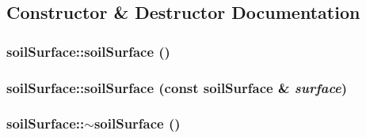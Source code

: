 \subsection{Constructor \& Destructor Documentation}
\hypertarget{classsoil_surface_a2a00df0b447ca767c659411db75ffaf4}{
\subsubsection[{soilSurface}]{\setlength{\rightskip}{0pt plus 5cm}soilSurface::soilSurface ()}}
\label{classsoil_surface_a2a00df0b447ca767c659411db75ffaf4}
\hypertarget{classsoil_surface_a972c99897a9210cabbc1d7c8403c91c7}{
\subsubsection[{soilSurface}]{\setlength{\rightskip}{0pt plus 5cm}soilSurface::soilSurface (const {\bf soilSurface} \& {\em surface})}}
\label{classsoil_surface_a972c99897a9210cabbc1d7c8403c91c7}
\hypertarget{classsoil_surface_a8bae6caa8bdbdd3893f861f72c15ea80}{
\subsubsection[{$\sim$soilSurface}]{\setlength{\rightskip}{0pt plus 5cm}soilSurface::$\sim$soilSurface ()}}
\label{classsoil_surface_a8bae6caa8bdbdd3893f861f72c15ea80}


